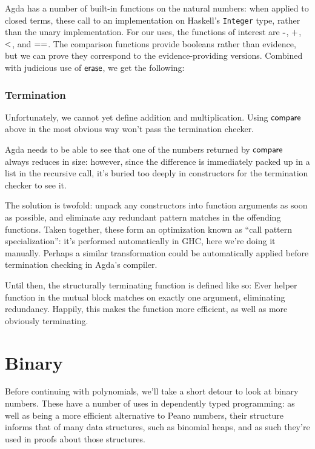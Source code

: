 \documentclass[draft, twocolumn]{article}
\begin{document}
Agda has a number of built-in functions on the natural numbers: when applied to
closed terms, these call to an implementation on Haskell's \texttt{Integer}
type, rather than the unary implementation. For our uses, the functions of
interest are \(\AgdaFunction{-}\), \(\AgdaFunction{+}\), \(\AgdaFunction{<}\),
and \(\AgdaFunction{==}\). The comparison functions provide booleans rather than
evidence, but we can prove they correspond to the evidence-providing versions.
Combined with judicious use of \(\AgdaFunction{erase}\), we get the following:
\subsubsection{Termination}
Unfortunately, we cannot yet define addition and multiplication. Using
\(\AgdaFunction{compare}\) above in the most obvious way won't pass the
termination checker.

Agda needs to be able to see that one of the numbers returned by
\(\AgdaFunction{compare}\) always reduces in size: however, since the difference
is immediately packed up in a list in the recursive call, it's buried too deeply
in constructors for the termination checker to see it.

The solution is twofold: unpack any constructors into function arguments as soon
as possible, and eliminate any redundant pattern matches in the offending
functions. Taken together, these form an optimization known as ``call pattern
specialization''\cite{jones_call-pattern_2007}: it's performed automatically in
GHC, here we're doing it manually. Perhaps a similar transformation could be
automatically applied before termination checking in Agda's compiler.

Until then, the structurally terminating function is defined like so:
Ever helper function in the mutual block matches on exactly one argument,
eliminating redundancy. Happily, this makes the function more efficient, as well
as more obviously terminating.
\section{Binary}
Before continuing with polynomials, we'll take a short detour to look at binary
numbers. These have a number of uses in dependently typed programming: as well
as being a more efficient alternative to Peano numbers, their structure informs
that of many data structures, such as binomial heaps, and as such they're used
in proofs about those structures.
\end{document}
